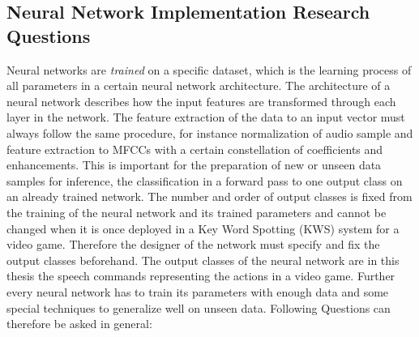 
\subsection{Neural Network Implementation Research Questions}\label{sec:intro_rq_nn}
Neural networks are \emph{trained} on a specific dataset, which is the learning process of all parameters in a certain neural network architecture. 
The architecture of a neural network describes how the input features are transformed through each layer in the network.
The feature extraction of the data to an input vector must always follow the same procedure, for instance normalization of audio sample and feature extraction to MFCCs with a certain constellation of coefficients and enhancements.
This is important for the preparation of new or unseen data samples for inference, the classification in a forward pass to one output class on an already trained network.
The number and order of output classes is fixed from the training of the neural network and its trained parameters and cannot be changed when it is once deployed in a Key Word Spotting (KWS) system for a video game.
Therefore the designer of the network must specify and fix the output classes beforehand.
The output classes of the neural network are in this thesis the speech commands representing the actions in a video game.
Further every neural network has to train its parameters with enough data and some special techniques to generalize well on unseen data.
Following Questions can therefore be asked in general:

